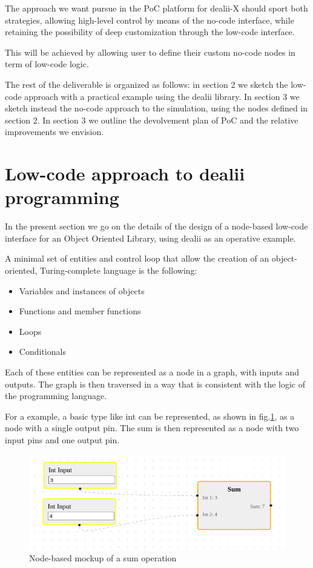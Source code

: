 \documentclass[a4paper,12pt]{article}
\begin{document}
The approach we want pursue in the PoC platform for dealii-X should sport both strategies, allowing high-level control by means of the no-code interface, while retaining the possibility of deep customization through the low-code interface. 

This will be achieved by allowing user to define their custom no-code nodes in term of low-code logic.

The rest of the deliverable is organized as follows: in section 2 we sketch the low-code approach with a practical example using the dealii library. In section 3 we sketch instead the no-code approach to the simulation, using the nodes defined in section 2. In section 3 we outline the devolvement plan of PoC and the relative improvements we envision. 


\section{\textcolor{EUblue}{Low-code approach to dealii programming}}

In the present section we go on the details of the design of a node-based low-code interface for an Object Oriented Library, using dealii as an operative example.

A minimal set of entities and control loop that allow the creation of an object-oriented, Turing-complete language is the following:
\begin{itemize}
\item Variables and instances of objects
\item Functions and member functions
\item Loops
\item Conditionals
\end{itemize}

Each of these entities can be represented as a node in a graph, with inputs and outputs. The graph is then traversed in a way that is consistent with the logic of the programming language.

For a example, a basic type like int can be represented, as shown in fig.\ref{sum}, as a node with a single output pin. The sum is then represented as a node with two input pins and one output pin. 

\begin{figure}
    \label{sum}
    \includegraphics[width=400pt]{sum.png}
    \caption{Node-based mockup of a sum operation}
\end{figure}
\end{document}
